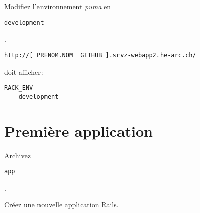 Modifiez l'environnement \emph{puma} en
\begin{otherlanguage}{english}\texttt{development}\end{otherlanguage}.

\begin{otherlanguage}{english}\texttt{http://{[}\ PRENOM.NOM\ \textbar{}\ GITHUB\ {]}.srvz-webapp2.he-arc.ch/}\end{otherlanguage}
doit afficher:

\begin{otherlanguage}{english}

\begin{verbatim}
RACK_ENV
    development
\end{verbatim}

\end{otherlanguage}

\hypertarget{premiuxe8re-application}{%
\section{Première application}\label{premiuxe8re-application}}

Archivez \begin{otherlanguage}{english}\texttt{app}\end{otherlanguage}.

\begin{otherlanguage}{english}

\begin{Shaded}
\begin{Highlighting}[]
\NormalTok{$ }
\NormalTok{$ }
\end{Highlighting}
\end{Shaded}

\end{otherlanguage}

Créez une nouvelle application Rails.

\begin{otherlanguage}{english}

\begin{Shaded}
\begin{Highlighting}[]
\NormalTok{$ }
\NormalTok{$ }
\end{Highlighting}
\end{Shaded}

\end{otherlanguage}

